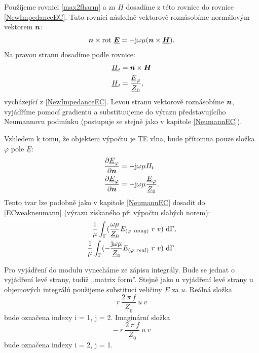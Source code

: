 \documentclass[12pt,a4paper,oneside]{article}
\numberwithin{equation}{section} %
\numberwithin{figure}{section} %
\numberwithin{table}{section} %
\newcommand{\mj}{\mathrm{j}} %
\renewcommand{\vec}[1]{\mbox{\boldmath$#1$}} %
\newcommand{\faz}[1]{{\underline{#1}}} %
\newcommand{\rot}{\mathrm{rot}\ }
\begin{document}
Použijeme rovnici \ref{max2fharm} a za $\faz{H}$ dosadíme z této rovnice do rovnice \ref{NewImpedanceEC}. Tuto rovnici následně vektorově roznásobíme normálovým vektorem $\vec{n}$:
\begin{equation}
\vec{n} \times \rot \faz{\vec{E}} = - \mj \omega \mu (\vec{n} \times \faz{\vec{H}}) .
\end{equation}
Na pravou stranu dosadíme podle rovnice:
\begin{subequations}
\begin{align}
\faz{H} _t &= \vec{n} \times \vec{H}
\\
\faz{H} _t &= \frac{\faz{E} _{\varphi}}{\faz{Z} _0} ,
\end{align}
\end{subequations}
vycházející z \ref{NewImpedanceEC}. Levou stranu vektorově roznásobíme $\vec{n}$, vyjádříme pomocí gradientu a substituujeme do výrazu představujícího Neumannovu podmínku (postupuje se stejně jako v kapitole \ref{NeumannEC}).

Vzhledem k tomu, že objektem výpočtu je TE vlna, bude přítomna pouze složka ${\varphi}$ pole $\faz{E}$:
\begin{subequations}
\begin{align}
\frac{\partial \faz{E} _{\varphi}}{\partial \vec{n}} &= - \mj \omega \mu H _t
\\
\frac{\partial \faz{E} _{\varphi}}{\partial \vec{n}} &= - \mj \omega \mu \frac{\faz{E} _{\varphi}}{\faz{Z} _0} .
\end{align}
\end{subequations}
Tento tvar lze podobně jako v kapitole \ref{NeumannEC} dosadit do \ref{ECweakneumann} (výrazu získaného při výpočtu slabých norem):
\begin{subequations}
\begin{align}
\frac{1}{\mu} \int _{\Gamma} ( \frac{\omega \mu}{\faz{Z} _0} E _{(\varphi ~ imag)} ~ r ~ v ) ~ \ud \Gamma ,
\\ 
\frac{1}{\mu} \int _{\Gamma} ( - \frac{\mj \omega \mu}{\faz{Z} _0} E _{(\varphi ~ real)} ~ r ~ v ) ~ \ud \Gamma .
\end{align}
\end{subequations}

Pro vyjádření do modulu vynecháme ze zápisu integrály. Bude se jednat o vyjádření levé strany, tudíž ,,matrix form''. Stejně jako u vyjádření levé strany u objemových integrálů použijeme substituci veličiny $E$ za $u$. Reálná složka 
\begin{equation}
r ~\frac{2 ~ \pi ~ f}{\faz{Z} _0} ~ u ~ v
\end{equation} 
bude označena indexy i = 1, j = 2. Imaginární složka 
\begin{equation}
- ~ r ~ \frac{2 ~ \pi ~ f}{\faz{Z} _0} ~ u ~ v
\end{equation}
bude označena indexy i = 2, j = 1.
\end{document}
